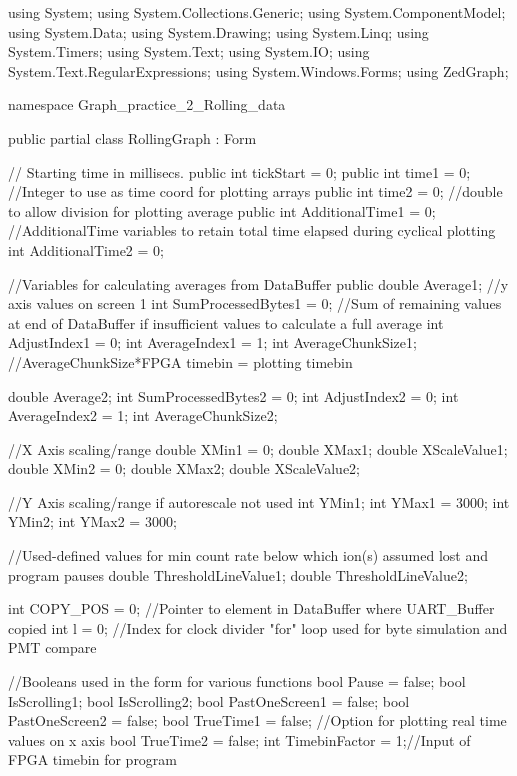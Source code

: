 ﻿using System;
using System.Collections.Generic;
using System.ComponentModel;
using System.Data;
using System.Drawing;
using System.Linq;
using System.Timers;
using System.Text;
using System.IO;
using System.Text.RegularExpressions;
using System.Windows.Forms;
using ZedGraph;


namespace Graph_practice_2_Rolling_data
{


    public partial class RollingGraph : Form
    {
        // Starting time in millisecs.
        public int tickStart = 0;
        public int time1 = 0; //Integer to use as time coord for plotting arrays
        public int time2 = 0; //double to allow division for plotting average
        public int AdditionalTime1 = 0; //AdditionalTime variables to retain total time elapsed during cyclical plotting
        int AdditionalTime2 = 0;

        //Variables for calculating averages from DataBuffer
        public double Average1; //y axis values on screen 1
        int SumProcessedBytes1 = 0; //Sum of remaining values at end of DataBuffer if insufficient values to calculate a full average
        int AdjustIndex1 = 0;
        int AverageIndex1 = 1;
        int AverageChunkSize1; //AverageChunkSize*FPGA timebin = plotting timebin
        
        double Average2;
        int SumProcessedBytes2 = 0;
        int AdjustIndex2 = 0;
        int AverageIndex2 = 1;
        int AverageChunkSize2;

        //X Axis scaling/range
        double XMin1 = 0;
        double XMax1;
        double XScaleValue1;
        double XMin2 = 0;
        double XMax2;
        double XScaleValue2;

        //Y Axis scaling/range if autorescale not used
        int YMin1;
        int YMax1 = 3000;
        int YMin2;
        int YMax2 = 3000;

        //Used-defined values for min count rate below which ion(s) assumed lost and program pauses
        double ThresholdLineValue1;
        double ThresholdLineValue2;

        int COPY_POS = 0;  //Pointer to element in DataBuffer where UART_Buffer copied
        int l = 0; //Index for clock divider "for" loop used for byte simulation and PMT compare

        //Booleans used in the form for various functions
        bool Pause = false;
        bool IsScrolling1;
        bool IsScrolling2;
        bool PastOneScreen1 = false;
        bool PastOneScreen2 = false;
        bool TrueTime1 = false; //Option for plotting real time values on x axis
        bool TrueTime2 = false;
        int TimebinFactor = 1;//Input of FPGA timebin for program
        
}}
